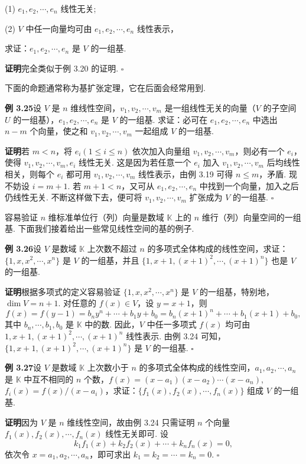 \documentclass[UTF8,12pt,a4paper,fontset=fandol]{ctexart}
\begin{document}
(1) $e_1,e_2,\cdots,e_n$ 线性无关;

(2) $V$ 中任一向量均可由 $e_1,e_2,\cdots,e_n$ 线性表示，

求证：$e_1,e_2,\cdots,e_n$ 是 $V$ 的一组基.

\noindent\textbf{证明}\quad 完全类似于例 3.20 的证明. $\square$

下面的命题通常称为基扩张定理，它在后面会经常用到.

\noindent\textbf{例 3.25}\quad 设 $V$ 是 $n$ 维线性空间，$v_1,v_2,\cdots,v_m$ 是一组线性无关的向量（$V$ 的子空间 $U$ 的一组基），$e_1,e_2,\cdots,e_n$ 是 $V$ 的一组基. 求证：必可在 $e_1,e_2,\cdots,e_n$ 中选出 $n-m$ 个向量，使之和 $v_1,v_2,\cdots,v_m$ 一起组成 $V$ 的一组基.

\noindent\textbf{证明}\quad 若 $m<n$，将 $e_i(1\le i\le n)$ 依次加入向量组 $v_1,v_2,\cdots,v_m$，则必有一个 $e_i$，使得 $v_1,v_2,\cdots,v_m,e_i$ 线性无关. 这是因为若任意一个 $e_i$ 加入 $v_1,v_2,\cdots,v_m$ 后均线性相关，则每个 $e_i$ 都可用 $v_1,v_2,\cdots,v_m$ 线性表示，由例 3.19 可得 $n\le m$，矛盾. 现不妨设 $i=m+1$. 若 $m+1<n$，又可从 $e_1,e_2,\cdots,e_n$ 中找到一个向量，加入之后仍线性无关. 不断这样做下去，便可将 $v_1,v_2,\cdots,v_m$ 扩张成为 $V$ 的一组基. $\square$

容易验证 $n$ 维标准单位行（列）向量是数域 $\mathbb{K}$ 上的 $n$ 维行（列）向量空间的一组基. 下面我们接着给出一些常见线性空间的基的例子.

\noindent\textbf{例 3.26}\quad 设 $V$ 是数域 $\mathbb{K}$ 上次数不超过 $n$ 的多项式全体构成的线性空间，求证：$\{1,x,x^2,\cdots,x^n\}$ 是 $V$ 的一组基，并且 $\{1,x+1,(x+1)^2,\cdots,(x+1)^n\}$ 也是 $V$ 的一组基.

\noindent\textbf{证明}\quad 根据多项式的定义容易验证 $\{1,x,x^2,\cdots,x^n\}$ 是 $V$ 的一组基，特别地，$\dim V=n+1$. 对任意的 $f(x)\in V$，设 $y=x+1$，则
\[
f(x)=f(y-1)=b_ny^n+\cdots+b_1y+b_0=b_n(x+1)^n+\cdots+b_1(x+1)+b_0,
\]
其中 $b_n,\cdots,b_1,b_0$ 是 $\mathbb{K}$ 中的数. 因此，$V$ 中任一多项式 $f(x)$ 均可由 $1,x+1,(x+1)^2,\cdots,(x+1)^n$ 线性表示. 由例 3.24 可知，$\{1,x+1,(x+1)^2,\cdots,(x+1)^n\}$ 是 $V$ 的一组基. $\square$

\noindent\textbf{例 3.27}\quad 设 $V$ 是数域 $\mathbb{K}$ 上次数小于 $n$ 的多项式全体构成的线性空间，$a_1,a_2,\cdots,a_n$ 是 $\mathbb{K}$ 中互不相同的 $n$ 个数，$f(x)=(x-a_1)(x-a_2)\cdots(x-a_n)$, $f_i(x)=f(x)/(x-a_i)$，求证：$\{f_1(x),f_2(x),\cdots,f_n(x)\}$ 组成 $V$ 的一组基.

\noindent\textbf{证明}\quad 因为 $V$ 是 $n$ 维线性空间，故由例 3.24 只需证明 $n$ 个向量 $f_1(x),f_2(x),\cdots,f_n(x)$ 线性无关即可. 设
\[
k_1f_1(x)+k_2f_2(x)+\cdots+k_nf_n(x)=0,
\]
依次令 $x=a_1,a_2,\cdots,a_n$，即可求出 $k_1=k_2=\cdots=k_n=0$. $\square$
\end{document}

